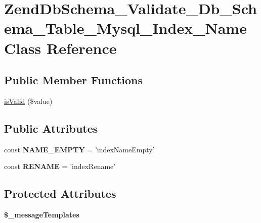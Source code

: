 \hypertarget{classZendDbSchema__Validate__Db__Schema__Table__Mysql__Index__Name}{\section{\-Zend\-Db\-Schema\-\_\-\-Validate\-\_\-\-Db\-\_\-\-Schema\-\_\-\-Table\-\_\-\-Mysql\-\_\-\-Index\-\_\-\-Name \-Class \-Reference}
\label{classZendDbSchema__Validate__Db__Schema__Table__Mysql__Index__Name}
}
\subsection*{\-Public \-Member \-Functions}
\begin{DoxyCompactItemize}
\item 
\hyperlink{classZendDbSchema__Validate__Db__Schema__Table__Mysql__Index__Name_a3d89ef5c6c90596b33569a18698a8b54}{is\-Valid} (\$value)
\end{DoxyCompactItemize}
\subsection*{\-Public \-Attributes}
\begin{DoxyCompactItemize}
\item 
\hypertarget{classZendDbSchema__Validate__Db__Schema__Table__Mysql__Index__Name_a94c2202d23fa20f6e30aefb9339b3f8b}{const {\bfseries \-N\-A\-M\-E\-\_\-\-E\-M\-P\-T\-Y} = 'index\-Name\-Empty'}\label{classZendDbSchema__Validate__Db__Schema__Table__Mysql__Index__Name_a94c2202d23fa20f6e30aefb9339b3f8b}

\item 
\hypertarget{classZendDbSchema__Validate__Db__Schema__Table__Mysql__Index__Name_aa3cdcc3d495a28c1b6ef1c678fd11de3}{const {\bfseries \-R\-E\-N\-A\-M\-E} = 'index\-Rename'}\label{classZendDbSchema__Validate__Db__Schema__Table__Mysql__Index__Name_aa3cdcc3d495a28c1b6ef1c678fd11de3}

\end{DoxyCompactItemize}
\subsection*{\-Protected \-Attributes}
\begin{DoxyCompactItemize}
\item 
{\bfseries \$\-\_\-message\-Templates}
\end{DoxyCompactItemize}


